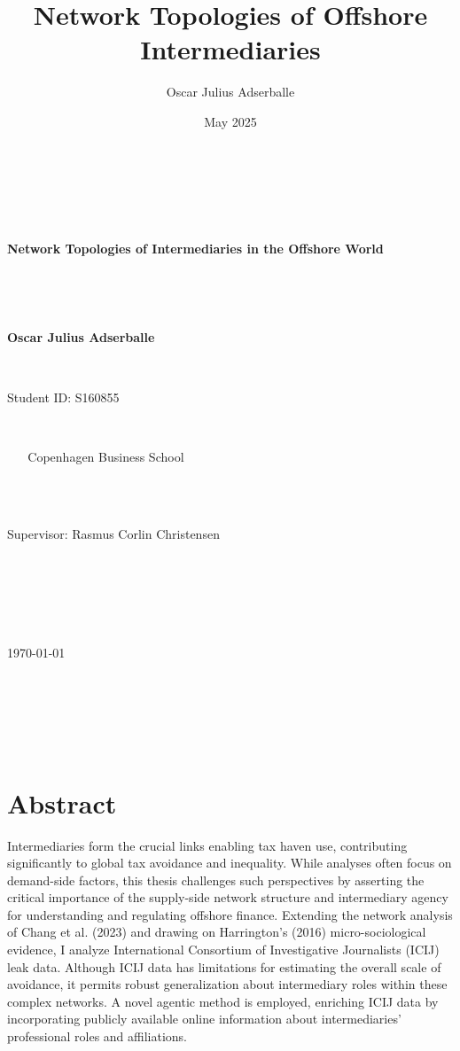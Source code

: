 \documentclass[12pt, a4paper]{report}
\title{Network Topologies of Offshore Intermediaries}
\author{Oscar Julius Adserballe}
\date{May 2025}
\begin{document}
\begin{titlepage}
    \centering
    \vspace*{1cm} 

    {\Huge\bfseries Network Topologies of Intermediaries in the Offshore World\par}

    \vspace{1.5cm}

    {\Large\bfseries Oscar Julius Adserballe\par} 
    {\large Student ID: S160855\par} 

    \vspace{1cm}

    {\large Copenhagen Business School} \\ %

    \vspace{2cm}

    {\large Supervisor: Rasmus Corlin Christensen\par} 

    \vspace{1.5cm}

    {\large \today\par} 

    \vfill 
\end{titlepage}

\pagestyle{plain} %

\newpage
\tableofcontents %

\newpage
\listoffigures %

\newpage
\listoftables  %

\newpage

\chapter*{Abstract}
\label{sec:abstract}

   Intermediaries form the crucial links enabling tax haven use, contributing significantly to global tax avoidance and inequality. While analyses often focus on demand-side factors, this thesis challenges such perspectives by asserting the critical importance of the supply-side network structure and intermediary agency for understanding and regulating offshore finance. Extending the network analysis of Chang et al. (2023) and drawing on Harrington's (2016) micro-sociological evidence, I analyze International Consortium of Investigative Journalists (ICIJ) leak data. Although ICIJ data has limitations for estimating the overall scale of avoidance, it permits robust generalization about intermediary roles within these complex networks. A novel agentic method is employed, enriching ICIJ data by incorporating publicly available online information about intermediaries' professional roles and affiliations. 
\end{document}
